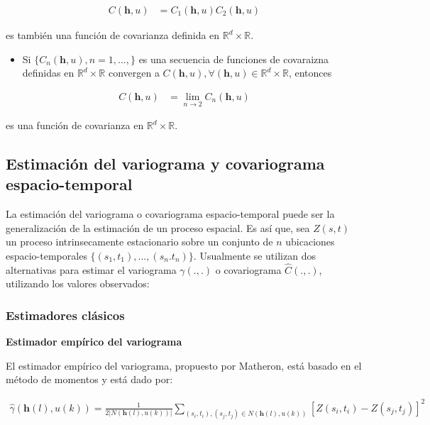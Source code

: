 \documentclass[
]{book}
\providecommand{\tightlist}{%
  \setlength{\itemsep}{0pt}\setlength{\parskip}{0pt}}
\begin{document}
\begin{align}
C(\textbf{h},u)&=C_1(\textbf{h},u)C_2(\textbf{h},u)
\end{align}

es también una función de covarianza definida en \(\mathbb{R}^d\times \mathbb{R}\).

\begin{itemize}
\tightlist
\item
  Si \(\{C_n(\textbf{h},u),n=1,...,\}\) es una secuencia de funciones de covaraizna definidas en \(\mathbb{R}^d \times \mathbb{R}\) convergen a \(C(\textbf{h},u), \forall (\textbf{h},u) \in \mathbb{R}^d \times \mathbb{R}\), entonces
\end{itemize}

\begin{align}
C(\textbf{h},u)&=\lim_{n\to 2} C_n(\textbf{h},u)
\end{align}

es una función de covarianza en \(\mathbb{R}^d \times \mathbb{R}\).

\hypertarget{estimaciuxf3n-del-variograma-y-covariograma-espacio-temporal}{%
\subsection{Estimación del variograma y covariograma espacio-temporal}\label{estimaciuxf3n-del-variograma-y-covariograma-espacio-temporal}}

La estimación del variograma o covariograma espacio-temporal puede ser la generalización de la estimación de un proceso espacial. Es así que, sea \(Z(s,t)\) un proceso intrinsecamente estacionario sobre un conjunto de \(n\) ubicaciones espacio-temporales \(\{(s_1,t_1),...,(s_n.t_n)\}\).
Usualmente se utilizan dos alternativas para estimar el variograma \(\gamma(.,.)\) o covariograma \({\hat{C}(.,.)}\), utilizando los valores observados:

\hypertarget{estimadores-cluxe1sicos}{%
\subsubsection{Estimadores clásicos}\label{estimadores-cluxe1sicos}}

\textbf{Estimador empírico del variograma}

El estimador empírico del variograma, propuesto por Matheron, está basado en el método de momentos y está dado por:

\begin{align}
{\hat{\gamma}}(\textbf{h}(l),u(k))=\frac{1}{2|N(\textbf{h}(l),u(k))|} \sum_{(s_i,t_i),(s_j,t_j)\in N(\textbf{h}(l),u(k))} [Z(s_i,t_i)-Z(s_j,t_j)]^2
\end{align}
\end{document}
